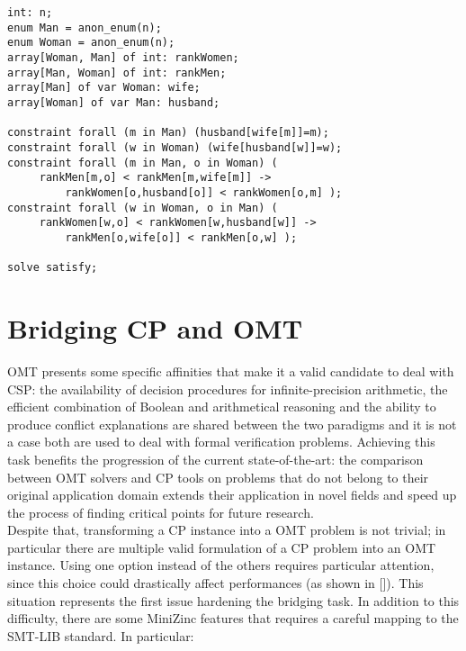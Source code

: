 \begin{lstlisting}[style=interfaces,caption=An example of MiniZinc encoding regarding the popular Stable Marriage Problem.]
int: n;
enum Man = anon_enum(n);
enum Woman = anon_enum(n);
array[Woman, Man] of int: rankWomen;
array[Man, Woman] of int: rankMen;
array[Man] of var Woman: wife;
array[Woman] of var Man: husband;

constraint forall (m in Man) (husband[wife[m]]=m);
constraint forall (w in Woman) (wife[husband[w]]=w);
constraint forall (m in Man, o in Woman) (
     rankMen[m,o] < rankMen[m,wife[m]] -> 
         rankWomen[o,husband[o]] < rankWomen[o,m] );
constraint forall (w in Woman, o in Man) (
     rankWomen[w,o] < rankWomen[w,husband[w]] -> 
         rankMen[o,wife[o]] < rankMen[o,w] );
         
solve satisfy;
\end{lstlisting}

\section{Bridging CP and OMT}

OMT presents some specific affinities that make it a valid candidate to deal with CSP: the availability of decision procedures for infinite-precision arithmetic, the efficient combination of
Boolean and arithmetical reasoning and the ability to produce conflict explanations are shared between the two paradigms and it is not a case both are used to deal with formal verification problems. Achieving this task benefits the progression of the current state-of-the-art: the comparison between OMT solvers and CP tools on problems that do not belong to their original application domain extends their application in novel fields and speed up the process of finding critical points for future research. \\ 
Despite that, transforming a CP instance into a OMT problem is not trivial; in particular there are multiple valid formulation of a CP problem into an OMT instance. Using one option instead of the others requires particular attention, since this choice could drastically affect performances (as shown in []). This situation represents the first issue hardening the bridging task. In addition to this difficulty, there are some MiniZinc features that requires a careful mapping to the SMT-LIB standard. In particular:

